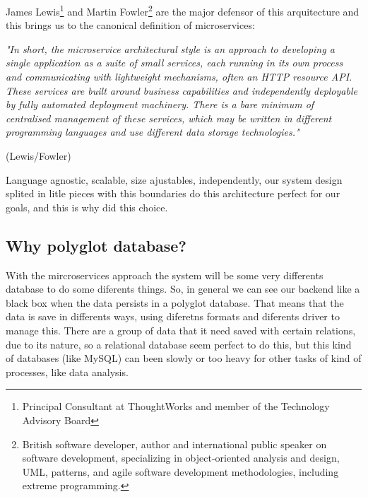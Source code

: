 James Lewis\footnote{Principal Consultant at ThoughtWorks and
member of the Technology Advisory Board} and Martin Fowler\footnote{British software developer,
author and international public speaker on software development, specializing in
object-oriented analysis and design, UML, patterns, and agile software development
methodologies, including extreme programming.} are the major defensor of this
arquitecture and this brings us to the canonical definition of microservices:


\begin{minipage}{0.9\linewidth}
        \vspace{5pt}%
        {\small
        \textit{"In short, the microservice architectural style is an approach to developing a
        single application as a suite of small services, each running in its own process
        and communicating with lightweight mechanisms, often an HTTP resource API.
        These services are built around business capabilities and independently deployable
        by fully automated deployment machinery. There is a bare minimum of centralised management
        of these services, which may be written in different programming languages and
        use different data storage technologies."}
        }
        \begin{flushright}
            (Lewis/Fowler)
        \end{flushright}
        \vspace{5pt}%
    \end{minipage}


\noindent Language agnostic, scalable, size ajustables, independently, our system design
splited in litle pieces with this boundaries do this architecture perfect for
our goals, and this is why did this choice.

\subsection{Why polyglot database?}

With the mircroservices approach the system will be some very differents
database to do some diferents things. So, in general we can see our
backend like a black box when the data persists in a polyglot database.
That means that the data is save in differents ways, using diferetns
formats and diferents driver to manage this. There are a group of
data that it need saved with certain relations, due to its nature,
so a relational database seem perfect to do this, but this kind of
databases (like MySQL) can been slowly or too heavy for other tasks
of kind of processes, like data analysis.

